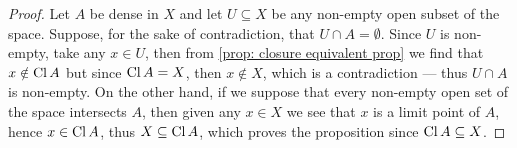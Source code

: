 \begin{proof}
    Let \(A\) be dense in \(X\) and let \(U \subseteq X\) be any non-empty
    open subset of the space. Suppose, for the sake of contradiction, that \(U \cap
    A = \emptyset\). Since \(U\) is non-empty, take any \(x \in U\), then from
    \cref{prop: closure equivalent prop} we find that \(x \notin \operatorname{Cl} A\) but
    since \(\operatorname{Cl} A = X\), then \(x \notin X\), which is a contradiction ---
    thus \(U \cap A\) is non-empty. On the other hand, if we suppose that every
    non-empty open set of the space intersects \(A\), then given any \(x \in X\) we
    see that \(x\) is a limit point of \(A\), hence \(x \in \operatorname{Cl} A\), thus \(X
    \subseteq \operatorname{Cl} A\), which proves the proposition since \(\operatorname{Cl} A
    \subseteq X\).
\end{proof}

